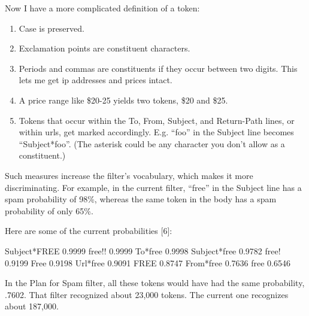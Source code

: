 Now I have a more complicated
                  definition of a token:
                  \begin{enumerate}
\item Case is preserved.


\item 
                      Exclamation points are constituent characters.


                    
\item 
                      Periods and commas are constituents if they occur between
                      two digits. This lets me get ip addresses and prices
                      intact.


                    
\item 
                      A price range like \$20-25 yields two tokens, \$20 and
                      \$25.


                    
\item 
                      Tokens that occur within the To, From, Subject, and
                      Return-Path lines, or within urls, get marked accordingly.
                      E.g. ``foo'' in the Subject line becomes ``Subject*foo''.
                      (The asterisk could be any character you don't allow as a
                      constituent.)
                    
\end{enumerate}

                  Such measures increase the filter's vocabulary, which makes it
                  more discriminating. For example, in the current filter,
                  ``free'' in the Subject line has a spam probability of 98\%,
                  whereas the same token in the body has a spam probability of
                  only 65\%.

Here are some of the current
                  probabilities [6]:


                    Subject*FREE      0.9999
free!!            0.9999
To*free           0.9998
Subject*free      0.9782
free!             0.9199
Free              0.9198
Url*free          0.9091
FREE              0.8747
From*free         0.7636
free              0.6546

                  
                  In the Plan for Spam filter, all these tokens would have had
                  the same probability, .7602. That filter recognized about
                  23,000 tokens. The current one recognizes about 187,000.

